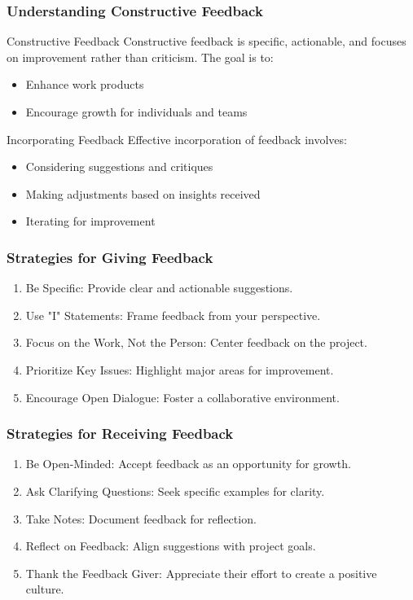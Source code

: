 \documentclass[aspectratio=169]{beamer}
\begin{document}
\begin{frame}[fragile]
    \frametitle{Understanding Constructive Feedback}
    \begin{block}{Constructive Feedback}
        Constructive feedback is specific, actionable, and focuses on improvement rather than criticism. The goal is to:
        \begin{itemize}
            \item Enhance work products
            \item Encourage growth for individuals and teams
        \end{itemize}
    \end{block}
    
    \begin{block}{Incorporating Feedback}
        Effective incorporation of feedback involves:
        \begin{itemize}
            \item Considering suggestions and critiques
            \item Making adjustments based on insights received
            \item Iterating for improvement
        \end{itemize}
    \end{block}
\end{frame}

\begin{frame}[fragile]
    \frametitle{Strategies for Giving Feedback}
    \begin{enumerate}
        \item Be Specific: Provide clear and actionable suggestions.
        \item Use "I" Statements: Frame feedback from your perspective.
        \item Focus on the Work, Not the Person: Center feedback on the project.
        \item Prioritize Key Issues: Highlight major areas for improvement.
        \item Encourage Open Dialogue: Foster a collaborative environment.
    \end{enumerate}
\end{frame}

\begin{frame}[fragile]
    \frametitle{Strategies for Receiving Feedback}
    \begin{enumerate}
        \item Be Open-Minded: Accept feedback as an opportunity for growth.
        \item Ask Clarifying Questions: Seek specific examples for clarity.
        \item Take Notes: Document feedback for reflection.
        \item Reflect on Feedback: Align suggestions with project goals.
        \item Thank the Feedback Giver: Appreciate their effort to create a positive culture.
    \end{enumerate}
\end{frame}
\end{document}
